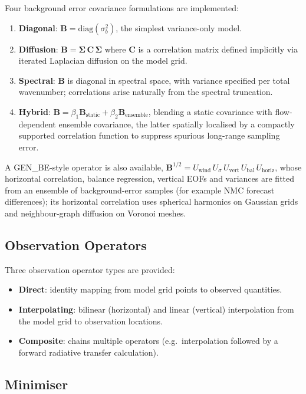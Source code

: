 \documentclass[11pt,a4paper]{article}
\begin{document}
Four background error covariance formulations are implemented:
\begin{enumerate}[nosep]
  \item \textbf{Diagonal}: $\bm B = \mathrm{diag}(\sigma_b^2)$, the simplest variance-only model.
  \item \textbf{Diffusion}: $\bm B = \bm\Sigma\,\bm C\,\bm\Sigma$ where $\bm C$ is a correlation matrix defined implicitly via iterated Laplacian diffusion on the model grid.
  \item \textbf{Spectral}: $\bm B$ is diagonal in spectral space, with variance specified per total wavenumber; correlations arise naturally from the spectral truncation.
  \item \textbf{Hybrid}: $\bm B = \beta_1\bm B_{\mathrm{static}} + \beta_2\bm B_{\mathrm{ensemble}}$, blending a static covariance with flow-dependent ensemble covariance, the latter spatially localised by a compactly supported \citet{GaspariCohn1999} correlation function to suppress spurious long-range sampling error.
\end{enumerate}
A GEN\_BE-style operator is also available, $\bm B^{1/2}=U_{\mathrm{wind}}\,U_\sigma\,U_{\mathrm{vert}}\,U_{\mathrm{bal}}\,U_{\mathrm{horiz}}$, whose horizontal correlation, balance regression, vertical EOFs and variances are fitted from an ensemble of background-error samples (for example NMC forecast differences); its horizontal correlation uses spherical harmonics on Gaussian grids and neighbour-graph diffusion on Voronoi meshes.

\subsection{Observation Operators}

Three observation operator types are provided:
\begin{itemize}[nosep]
  \item \textbf{Direct}: identity mapping from model grid points to observed quantities.
  \item \textbf{Interpolating}: bilinear (horizontal) and linear (vertical) interpolation from the model grid to observation locations.
  \item \textbf{Composite}: chains multiple operators (e.g.\ interpolation followed by a forward radiative transfer calculation).
\end{itemize}

\subsection{Minimiser}
\end{document}
